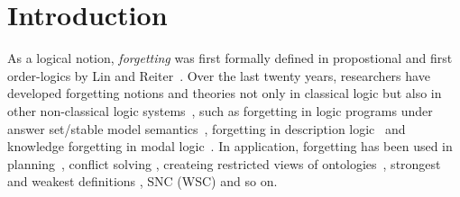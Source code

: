 \documentclass{article}
\begin{document}

\section{Introduction}
As a logical notion, \emph{forgetting} was first formally defined
in propostional and first order-logics by Lin and Reiter~\cite{lin1994forget}.
Over the last twenty years, researchers have developed forgetting notions and theories not only in classical logic but also in other non-classical logic systems~\cite{eiter2019brief}, such as forgetting in logic programs under answer set/stable model semantics~\cite{DBLP:Zhang:AIJ2006,Eiter2008Semantic,Wong:PhD:Thesis,Yisong:KR:2012,Yisong:IJCAI:2013}, forgetting in description logic~\cite{Wang:AMAI:2010,Lutz:IJCAI:2011,zhao2017role} and knowledge forgetting in modal logic~\cite{Yan:AIJ:2009,Kaile:JAIR:2009,Yongmei:IJCAI:2011,fang2019forgetting}. In application, forgetting has been used in planning~\cite{lin2003compiling},  conflict solving \cite{Lang2010Reasoning,Zhang2005Solving},
createing restricted views of ontologies~\cite{zhao2017role},
strongest and weakest definitions \cite{Lang2008On}, SNC (WSC) \cite{DBLP:journals/ai/Lin01} and so on.
\end{document}
